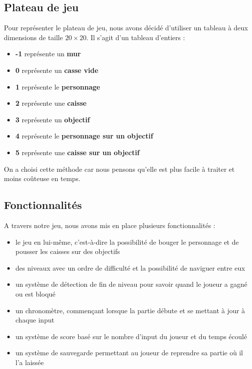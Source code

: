 \documentclass{article}
\begin{document}
\subsection{Plateau de jeu}

Pour représenter le plateau de jeu, nous avons décidé d'utiliser un tableau à deux dimensions de taille $20\times20$. Il s'agit d'un tableau d'entiers :
\begin{itemize}
    \item \textbf{-1} représente un \textbf{mur}
    \item \textbf{0} représente un \textbf{casse vide}
    \item \textbf{1} représente le \textbf{personnage}
    \item \textbf{2} représente une \textbf{caisse}
    \item \textbf{3} représente un \textbf{objectif}
    \item \textbf{4} représente le \textbf{personnage sur un objectif}
    \item \textbf{5} représente une \textbf{caisse sur un objectif}\\
   
\end{itemize}
On a choisi cette méthode car nous pensons qu'elle est plus facile à traiter et moins coûteuse en temps.

\subsection{Fonctionnalités}

A travers notre jeu, nous avons mis en place plusieurs fonctionnalités :\\
\begin{itemize}
    \item le jeu en lui-même, c'est-à-dire la possibilité de bouger le personnage et de pousser les caisses sur des objectifs
    \item des niveaux avec un ordre de difficulté et la possibilité de naviguer entre eux
    \item un système de détection de fin de niveau pour savoir quand le joueur a gagné ou est bloqué
    \item un chronomètre, commençant lorsque la partie débute et se mettant à jour à chaque input
    \item un système de score basé sur le nombre d'input du joueur et du temps écoulé
    \item un système de sauvegarde permettant au joueur de reprendre sa partie où il l'a laissée\\
   
\end{itemize}
\end{document}
